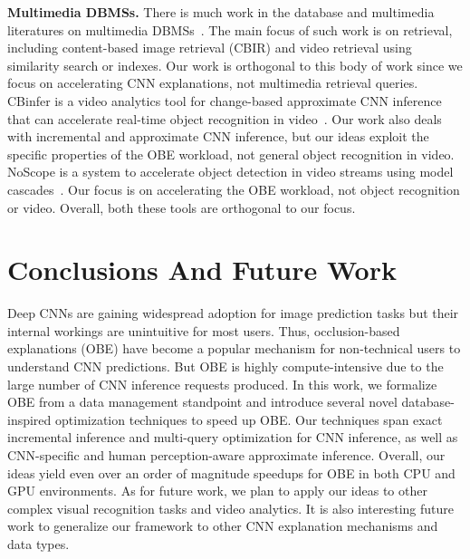 \documentclass[10pt, sigconf]{acmart}
\begin{document}
\vspace{2mm}
\noindent \textbf{Multimedia DBMSs.} 
There is much work in the database and multimedia literatures on multimedia DBMSs~\cite{adjeroh1997multimedia,kalipsiz2000multimedia}. The main focus of such work is on retrieval, including content-based image retrieval (CBIR) and video retrieval using similarity search or indexes. Our work is orthogonal to this body of work since we focus on accelerating CNN explanations, not multimedia retrieval queries. CBinfer is a video analytics tool for change-based approximate CNN inference that can accelerate real-time object recognition in video~\cite{cavigelli2017cbinfer}. Our work also deals with incremental and approximate CNN inference, but our ideas exploit the specific properties of the OBE workload, not general object recognition in video. NoScope is a system to accelerate object detection in video streams using model cascades~\cite{kang2017noscope}. Our focus is on accelerating the OBE workload, not object recognition or video. Overall, both these tools are orthogonal to our focus.

\section{Conclusions And Future Work}
Deep CNNs are gaining widespread adoption for image prediction tasks but their internal workings are unintuitive for most users. Thus, occlusion-based explanations (OBE) have become a popular mechanism for non-technical users to understand CNN predictions. But OBE is highly compute-intensive due to the large number of CNN inference requests produced. In this work, we formalize OBE from a data management standpoint and introduce several novel database-inspired optimization techniques to speed up OBE. Our techniques span exact incremental inference and multi-query optimization for CNN inference, as well as CNN-specific and human perception-aware approximate inference. Overall, our ideas yield even over an order of magnitude speedups for OBE in both CPU and GPU environments. As for future work, we plan to apply our ideas to other complex visual recognition tasks and video analytics. It is also interesting future work to generalize our framework to other CNN explanation mechanisms and data types.

\pagebreak






\end{document}

